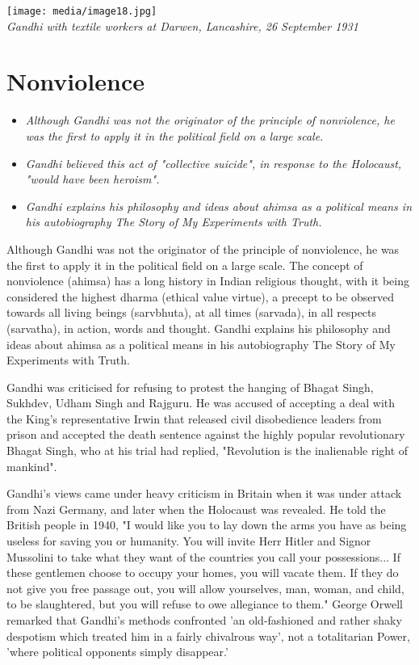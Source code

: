 \texttt{[image: media/image18.jpg]}\\
\emph{Gandhi with textile workers at Darwen, Lancashire, 26 September
1931}

\section{Nonviolence}\label{nonviolence}

\begin{itemize}
\item
  \emph{Although Gandhi was not the originator of the principle of
  nonviolence, he was the first to apply it in the political field on a
  large scale.}
\item
  \emph{Gandhi believed this act of "collective suicide", in response to
  the Holocaust, "would have been heroism".}
\item
  \emph{Gandhi explains his philosophy and ideas about ahimsa as a
  political means in his autobiography The Story of My Experiments with
  Truth.}
\end{itemize}

Although Gandhi was not the originator of the principle of nonviolence,
he was the first to apply it in the political field on a large scale.
The concept of nonviolence (ahimsa) has a long history in Indian
religious thought, with it being considered the highest dharma (ethical
value virtue), a precept to be observed towards all living beings
(sarvbhuta), at all times (sarvada), in all respects (sarvatha), in
action, words and thought. Gandhi explains his philosophy and ideas
about ahimsa as a political means in his autobiography The Story of My
Experiments with Truth.

Gandhi was criticised for refusing to protest the hanging of Bhagat
Singh, Sukhdev, Udham Singh and Rajguru. He was accused of accepting a
deal with the King's representative Irwin that released civil
disobedience leaders from prison and accepted the death sentence against
the highly popular revolutionary Bhagat Singh, who at his trial had
replied, "Revolution is the inalienable right of mankind".

Gandhi's views came under heavy criticism in Britain when it was under
attack from Nazi Germany, and later when the Holocaust was revealed. He
told the British people in 1940, "I would like you to lay down the arms
you have as being useless for saving you or humanity. You will invite
Herr Hitler and Signor Mussolini to take what they want of the countries
you call your possessions... If these gentlemen choose to occupy your
homes, you will vacate them. If they do not give you free passage out,
you will allow yourselves, man, woman, and child, to be slaughtered, but
you will refuse to owe allegiance to them." George Orwell remarked that
Gandhi's methods confronted 'an old-fashioned and rather shaky despotism
which treated him in a fairly chivalrous way', not a totalitarian Power,
'where political opponents simply disappear.'

